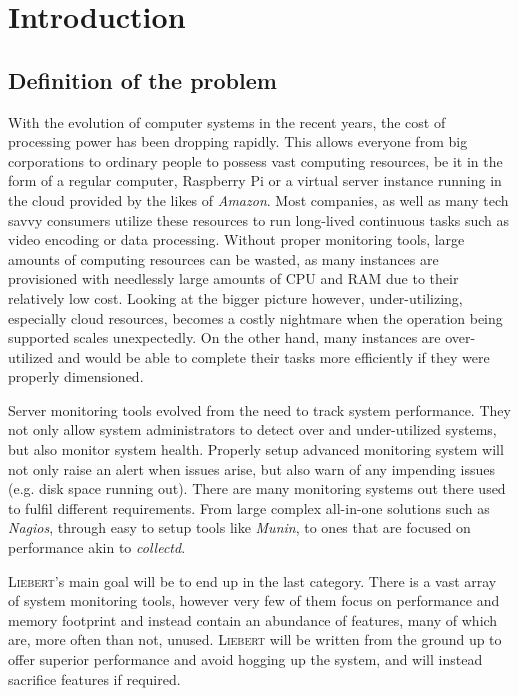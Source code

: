\section{Introduction}
    \subsection{Definition of the problem}
        With the evolution of computer systems in the recent years, the cost of processing power has been dropping rapidly. This allows everyone from big corporations to ordinary people to possess vast computing resources, be it in the form of a regular computer, Raspberry Pi or a virtual server instance running in the cloud provided by the likes of \textit{Amazon}. Most companies, as well as many tech savvy consumers utilize these resources to run long-lived continuous tasks such as video encoding or data processing. Without proper monitoring tools, large amounts of computing resources can be wasted, as many instances are provisioned with needlessly large amounts of CPU and RAM due to their relatively low cost. Looking at the bigger picture however, under-utilizing, especially cloud resources, becomes a costly nightmare when the operation being supported scales unexpectedly. On the other hand, many instances are over-utilized and would be able to complete their tasks more efficiently if they were properly dimensioned.

        Server monitoring tools evolved from the need to track system performance. They not only allow system administrators to detect over and under-utilized systems, but also monitor system health. Properly setup advanced monitoring system will not only raise an alert when issues arise, but also warn of any impending issues (e.g. disk space running out). There are many monitoring systems out there used to fulfil different requirements. From large complex all-in-one solutions such as \textit{Nagios}, through easy to setup tools like \textit{Munin}, to ones that are focused on performance akin to \textit{collectd}.

        \textsc{Liebert}'s main goal will be to end up in the last category. There is a vast array of system monitoring tools, however very few of them focus on performance and memory footprint and instead contain an abundance of features, many of which are, more often than not, unused. \textsc{Liebert} will be written from the ground up to offer superior performance and avoid hogging up the system, and will instead sacrifice features if required.


